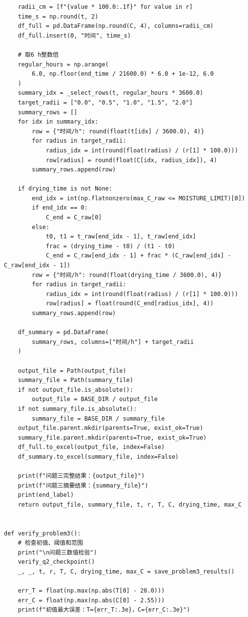 \documentclass[withoutpreface,bwprint]{cumcm_thesis}
\begin{document}
\begin{appendices}
\begin{lstlisting}
    radii_cm = [f"{value * 100.0:.1f}" for value in r]
    time_s = np.round(t, 2)
    df_full = pd.DataFrame(np.round(C, 4), columns=radii_cm)
    df_full.insert(0, "时间", time_s)

    # 取6 h整数倍
    regular_hours = np.arange(
        6.0, np.floor(end_time / 21600.0) * 6.0 + 1e-12, 6.0
    )
    summary_idx = _select_rows(t, regular_hours * 3600.0)
    target_radii = ["0.0", "0.5", "1.0", "1.5", "2.0"]
    summary_rows = []
    for idx in summary_idx:
        row = {"时间/h": round(float(t[idx] / 3600.0), 4)}
        for radius in target_radii:
            radius_idx = int(round(float(radius) / (r[1] * 100.0)))
            row[radius] = round(float(C[idx, radius_idx]), 4)
        summary_rows.append(row)

    if drying_time is not None:
        end_idx = int(np.flatnonzero(max_C_raw <= MOISTURE_LIMIT)[0])
        if end_idx == 0:
            C_end = C_raw[0]
        else:
            t0, t1 = t_raw[end_idx - 1], t_raw[end_idx]
            frac = (drying_time - t0) / (t1 - t0)
            C_end = C_raw[end_idx - 1] + frac * (C_raw[end_idx] - C_raw[end_idx - 1])
        row = {"时间/h": round(float(drying_time / 3600.0), 4)}
        for radius in target_radii:
            radius_idx = int(round(float(radius) / (r[1] * 100.0)))
            row[radius] = float(round(C_end[radius_idx], 4))
        summary_rows.append(row)

    df_summary = pd.DataFrame(
        summary_rows, columns=["时间/h"] + target_radii
    )

    output_file = Path(output_file)
    summary_file = Path(summary_file)
    if not output_file.is_absolute():
        output_file = BASE_DIR / output_file
    if not summary_file.is_absolute():
        summary_file = BASE_DIR / summary_file
    output_file.parent.mkdir(parents=True, exist_ok=True)
    summary_file.parent.mkdir(parents=True, exist_ok=True)
    df_full.to_excel(output_file, index=False)
    df_summary.to_excel(summary_file, index=False)

    print(f"问题三完整结果：{output_file}")
    print(f"问题三摘要结果：{summary_file}")
    print(end_label)
    return output_file, summary_file, t, r, T, C, drying_time, max_C


def verify_problem3():
    # 检查初值、阈值和范围
    print("\n问题三数值检验")
    verify_q2_checkpoint()
    _, _, t, r, T, C, drying_time, max_C = save_problem3_results()

    err_T = float(np.max(np.abs(T[0] - 28.0)))
    err_C = float(np.max(np.abs(C[0] - 2.55)))
    print(f"初值最大误差：T={err_T:.3e}，C={err_C:.3e}")


\end{lstlisting}
\end{appendices}
\end{document}
